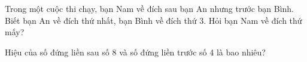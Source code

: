 \begin{ex}
Trong một cuộc thi chạy, bạn Nam về đích sau bạn An nhưng trước bạn Bình. Biết bạn An về đích thứ nhất, bạn Bình về đích thứ 3. Hỏi bạn Nam về đích thứ mấy?
\end{ex}

\begin{ex}
Hiệu của số đứng liền sau số 8 và số đứng liền trước số 4 là bao nhiêu?
\end{ex}
